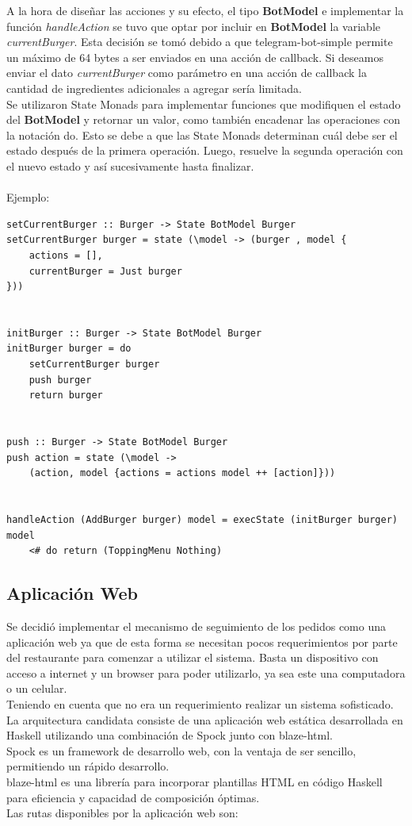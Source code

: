\documentclass[a4paper,12pt]{article}
\begin{document}
A la hora de diseñar las acciones y su efecto, el tipo \textbf{BotModel} e implementar la función \textit{handleAction} se tuvo que optar por incluir en \textbf{BotModel} la variable \textit{currentBurger}. Esta decisión se tomó debido a que telegram-bot-simple permite un máximo de 64 bytes a ser enviados en una acción de callback. Si deseamos enviar el dato \textit{currentBurger} como parámetro en una acción de callback la cantidad de ingredientes adicionales a agregar sería limitada.
\\
Se utilizaron State Monads para implementar funciones que modifiquen el estado del \textbf{BotModel} y retornar un valor, como también encadenar las operaciones con la notación do. Esto se debe a que las State Monads determinan cuál debe ser el estado después de la primera operación. Luego, resuelve la segunda operación con el nuevo estado y así sucesivamente hasta finalizar. 
\\\\
Ejemplo:

\begin{verbatim}
setCurrentBurger :: Burger -> State BotModel Burger
setCurrentBurger burger = state (\model -> (burger , model {
	actions = [], 
	currentBurger = Just burger 
}))


initBurger :: Burger -> State BotModel Burger
initBurger burger = do 
	setCurrentBurger burger
	push burger
	return burger


push :: Burger -> State BotModel Burger
push action = state (\model -> 
	(action, model {actions = actions model ++ [action]}))


handleAction (AddBurger burger) model = execState (initBurger burger) model 
	<# do return (ToppingMenu Nothing)

\end{verbatim}

\subsection{Aplicación Web}

Se decidió implementar el mecanismo de seguimiento de los pedidos como una aplicación web ya que de esta forma se necesitan pocos requerimientos por parte del restaurante para comenzar a utilizar el sistema. Basta un dispositivo con acceso a internet y un browser para poder utilizarlo, ya sea este una computadora o un celular.
\\
Teniendo en cuenta que no era un requerimiento realizar un sistema sofisticado. La arquitectura candidata consiste de una aplicación web estática desarrollada en Haskell utilizando una combinación de Spock junto con blaze-html.
\\
Spock \cite{spock} es un framework de desarrollo web, con la ventaja de ser sencillo, permitiendo un rápido desarrollo.
\\
blaze-html \cite{blaze-html} es una librería para incorporar plantillas HTML en código Haskell para eficiencia y capacidad de composición óptimas.
\\
Las rutas disponibles por la aplicación web son:
\end{document}

